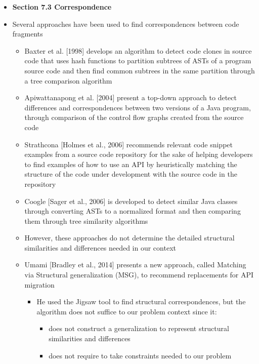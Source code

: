 \documentclass{article}
\newcommand{\bold}{\textbf}
\begin{document}
\begin{itemize} [leftmargin=.1in]
\item \bold{Section 7.3 Correspondence}
\item Several approaches have been used to find correspondences between code fragments
\begin{itemize}
\item Baxter et al. [1998] develops an algorithm to detect code clones in source code that uses hash functions to partition subtrees of ASTs of a program source code and then find common subtrees in the same partition through a tree comparison algorithm
\item Apiwattanapong et al. [2004] present a top-down approach to detect differences and correspondences between two versions of a Java program, through comparison of the control flow graphs created from the source code
\item Strathcona [Holmes et al., 2006] recommends relevant code snippet examples from a source code repository for the sake of helping developers to find examples of how to use an API by heuristically matching the structure of the code under
development with the source code in the repository
\item Coogle [Sager et al., 2006] is developed to detect similar Java classes through converting ASTs to a normalized format and then comparing them through tree similarity algorithms
\item However, these approaches do not determine the detailed structural similarities and differences needed in our context %
\item Umami [Bradley et al., 2014] presents a new approach, called Matching via Structural generalization (MSG), to recommend replacements for API migration
\begin{itemize}
\item He used the Jigsaw tool to find structural correspondences, but the algorithm does not suffice to our problem context since it:
\begin{itemize}
\item does not construct a generalization to represent structural similarities and differences
\item does not require to take constraints needed to our problem
\end{itemize}
\end{itemize}
\end{itemize}


\end{itemize}
\end{document}
